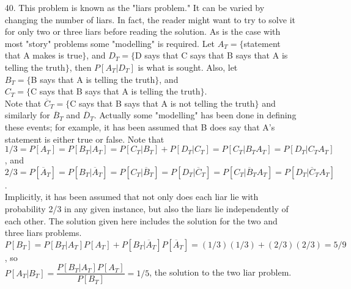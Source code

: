 \begin{enumerate}
	\item[40.] This problem is known as the "liars problem." It can be varied by changing the number of liars.  In fact, the reader might want to try to solve it for only two or three liars before reading the solution.  As is the case with most "story" problems some "modelling" is required.  Let $A_T = \{$statement that A makes is true$\}$, and $D_T = \{$D says that C says that B says that A is telling the truth$\}$, then $P[A_T\vert D_T]$ is what is sought.  Also, let \\
	$B_T = \{$B says that A is telling the truth$\}$, and \\ 
	$C_T = \{$C says that B says that A is telling the truth$\}$. \\
	Note that $\overline{C}_T = \{$C says that B says that A is not telling the truth$\}$ and similarly for $\overline{B}_T$ and $\overline{D}_T$.  Actually some "modelling" has been done in defining these events; for example, it has been assumed that B does say that A's statement is either true or false.  Note that \\
	$1/3 = P[A_T] = P[B_T\vert A_T] = P[C_T\vert B_T] +P[D_T\vert C_T] = P[C_T\vert B_TA_T] = P[D_T\vert C_TA_T]$, and \\
	$2/3 = P[\overline{A}_T] = P[B_T\vert \overline{A}_T] = P[C_T\vert \overline{B}_T] = P[D_T\vert \overline{C}_T] = P[C_T\vert \overline{B}_TA_T] = P[D_T\vert \overline{C}_TA_T]$. \\
	Implicitly, it has been assumed that not only does each liar lie with probability 2/3 in any given instance, but also the liars lie independently of each other.  The solution given here includes the solution for the two and three liars problems. \\
	$P[B_T] = P[B_T\vert A_T]P[A_T] + P[B_T\vert \overline{A}_T]P[\overline{A}_T] = (1/3)(1/3) + (2/3)(2/3) = 5/9$, so \\
	$P[A_T\vert B_T] = \dfrac{P[B_T\vert A_T]P[A_T]}{P[B_T]} = 1/5$, the solution to the two liar problem.
	

\end{enumerate}
